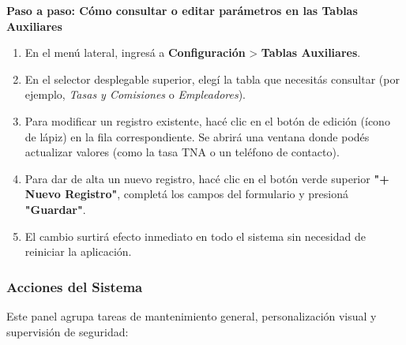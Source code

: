 \documentclass[12pt,a4paper]{article}
\renewcommand{\_}{\textunderscore\allowbreak}
\begin{document}
\textbf{Paso a paso: Cómo consultar o editar parámetros en las Tablas Auxiliares}
\begin{enumerate}
    \item En el menú lateral, ingresá a \textbf{Configuración} > \textbf{Tablas Auxiliares}.
    \item En el selector desplegable superior, elegí la tabla que necesitás consultar (por ejemplo, \textit{Tasas y Comisiones} o \textit{Empleadores}).
    \item Para modificar un registro existente, hacé clic en el botón de edición (ícono de lápiz) en la fila correspondiente. Se abrirá una ventana donde podés actualizar valores (como la tasa TNA o un teléfono de contacto).
    \item Para dar de alta un nuevo registro, hacé clic en el botón verde superior \textbf{"+ Nuevo Registro"}, completá los campos del formulario y presioná \textbf{"Guardar"}.
    \item El cambio surtirá efecto inmediato en todo el sistema sin necesidad de reiniciar la aplicación.
\end{enumerate}

\subsubsection{Acciones del Sistema}
Este panel agrupa tareas de mantenimiento general, personalización visual y supervisión de seguridad:
\end{document}
